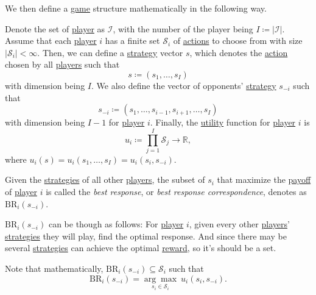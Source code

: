 We then define a \hyperref[def:game]{game} structure mathematically in the following way.
\begin{definition}\label{def:mathematical-game}
	Denote the set of \hyperref[def:player]{player} as \(\mathcal{I}\), with the number of the player being \(I\coloneqq \left\vert \mathcal{I} \right\vert \). Assume that each \hyperref[def:player]{player} \(i\) has a finite set \(\mathcal{S}_i\) of \hyperref[def:strategy]{actions} to choose from with size \(\left\vert \mathcal{S}_i \right\vert<\infty  \). Then, we can define a \hyperref[def:strategy]{strategy} vector \(s\), which denotes the \hyperref[def:strategy]{action} chosen by all \hyperref[def:player]{players} such that
	\[
		s\coloneqq (s_1, \dots , s_I)
	\]
	with dimension being \(I\). We also define the vector of opponents' \hyperref[def:strategy]{strategy} \(s_{-i}\) such that
	\[
		s_{-i}\coloneqq (s_1,\dots,s_{i - 1},s_{i + 1} ,\dots,s_I)
	\]
	with dimension being \(I - 1\) for \hyperref[def:player]{player} \(i\). Finally, the \hyperref[def:reward]{utility} function for \hyperref[def:player]{player} \(i\) is
	\[
		u_{i} \coloneqq \prod\limits_{j = 1}^{I} \mathcal{S}_j \to \mathbb{R},
	\]
	where \(u_{i}(s) = u_{i}(s_1, \dots , s_I) = u_{i}(s_{i}, s_{-i})\).
\end{definition}

\begin{definition}\label{def:best-response}
	Given the \hyperref[def:strategy]{strategies} of all other \hyperref[def:player]{players}, the subset of \(s_{i}\) that maximize the \hyperref[def:reward]{payoff} of \hyperref[def:player]{player} \(i\) is called the \emph{best response}, or \emph{best response correspondence}, denotes as \(\mathrm{BR}_i(s_{-i})\).
\end{definition}

\begin{intuition}
	\(\mathrm{BR}_i(s_{-i})\) can be though as follows: For \hyperref[def:player]{player} \(i\), given every other \hyperref[def:player]{players}' \hyperref[def:strategy]{strategies} they will play, find the optimal response. And since there may be several \hyperref[def:strategy]{strategies} can achieve the optimal \hyperref[def:reward]{reward}, so it's should be a set.
\end{intuition}

\begin{remark}
	Note that mathematically, \(\mathrm{BR}_i(s_{-i}) \subseteq \mathcal{S}_i\) such that
	\[
		\mathrm{BR}_i(s_{-i})= \underset{s_{i}\in\mathcal{S}_i}{\arg\max}\ u_{i}(s_{i}, s_{-i}).
	\]
\end{remark}